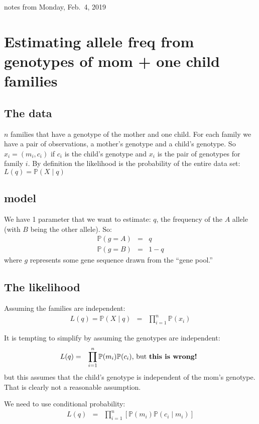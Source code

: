 \documentclass[11pt]{article}
\renewcommand{\Pr}{\mathbb{P}}
\begin{document}
notes from Monday, Feb.~4, 2019 \\
\section{Estimating allele freq from genotypes of mom + one child families}

\subsection{The data}
$n$ families that have a genotype of the mother and one child.
For each family we have a pair of observations, a mother's genotype and a child's genotype.
So $x_i = (m_i, c_i)$ if $c_i$ is the child's genotype and $x_i$ is the pair of genotypes
for family $i$.
By definition the likelihood is the probability of the entire data set: $L(q) = \Pr(X\mid q)$

\subsection{model}
We have 1 parameter that we want to estimate: $q$, the frequency of the $A$ allele (with $B$ being the other allele). So:
\begin{eqnarray}
  \Pr(g = A) & = & q \\
  \Pr(g = B) & = & 1- q
\end{eqnarray}
where $g$ represents some gene sequence drawn from the ``gene pool.''

\subsection{The likelihood}
Assuming the families are independent:
\begin{eqnarray}
  L(q) = \Pr(X\mid q) & = & \prod_{i=1}^{n}\Pr(x_i) 
\end{eqnarray}

It is tempting to simplify by assuming the genotypes are independent:
\begin{eqnarray}\nonumber
  L(q) & = & \prod_{i=1}^{n}\Pr(m_i)\Pr(c_i) \mbox{, but \bf{this is wrong!} } 
\end{eqnarray}
but this assumes that the child's genotype is independent of the mom's genotype. 
That is clearly not a reasonable assumption.

We need to use conditional probability:
\begin{eqnarray}\nonumber
  L(q) & = & \prod_{i=1}^{n}\left[\Pr\left(m_i\right)\Pr\left(c_i\mid m_i\right)\right]
\end{eqnarray}
\end{document}
